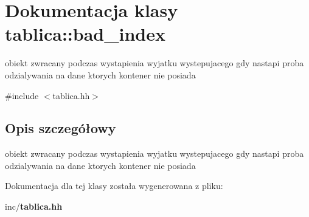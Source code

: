 \section{Dokumentacja klasy tablica\+:\+:bad\+\_\+index}
\label{classtablica_1_1bad__index}


obiekt zwracany podczas wystapienia wyjatku wystepujacego gdy nastapi proba odzialywania na dane ktorych kontener nie posiada  




{\ttfamily \#include $<$tablica.\+hh$>$}



\subsection{Opis szczegółowy}
obiekt zwracany podczas wystapienia wyjatku wystepujacego gdy nastapi proba odzialywania na dane ktorych kontener nie posiada 

Dokumentacja dla tej klasy została wygenerowana z pliku\+:\begin{DoxyCompactItemize}
\item 
inc/{\bf tablica.\+hh}\end{DoxyCompactItemize}
